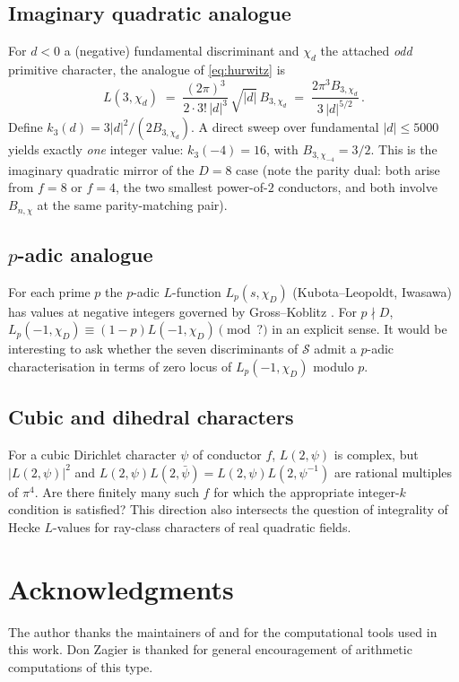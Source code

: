 \documentclass[11pt,reqno]{amsart}
\theoremstyle{plain}
\theoremstyle{definition}
\begin{document}
\subsection{Imaginary quadratic analogue}
For $d<0$ a (negative) fundamental discriminant and $\chi_{d}$ the
attached \emph{odd} primitive character, the analogue of
\eqref{eq:hurwitz} is
\[
L(3,\chi_{d})\;=\;\frac{(2\pi)^{3}}{2\cdot 3!\,|d|^{3}}\,
\sqrt{|d|}\,B_{3,\chi_{d}}\;=\;\frac{2\pi^{3}B_{3,\chi_{d}}}{3\,|d|^{5/2}}\,.
\]
Define $k_{3}(d)=3|d|^{2}/(2B_{3,\chi_{d}})$.  A direct sweep over
fundamental $|d|\le 5000$ yields exactly \emph{one} integer value:
$k_{3}(-4)=16$, with $B_{3,\chi_{-4}}=3/2$.  This is the imaginary
quadratic mirror of the $D=8$ case (note the parity dual: both
arise from $f=8$ or $f=4$, the two smallest power-of-$2$ conductors,
and both involve $B_{n,\chi}$ at the same parity-matching pair).

\subsection{$p$-adic analogue}
For each prime $p$ the $p$-adic $L$-function $L_{p}(s,\chi_{D})$
(Kubota--Leopoldt, Iwasawa) has values at negative integers governed
by Gross--Koblitz \cite{GrossKoblitz1979}.  For $p\nmid D$,
$L_{p}(-1,\chi_{D})\equiv (1-p)L(-1,\chi_{D})\pmod{?}$ in an explicit
sense.  It would be interesting to ask whether the seven
discriminants of $\mathcal{S}$ admit a $p$-adic characterisation in terms of
zero locus of $L_{p}(-1,\chi_{D})$ modulo $p$.

\subsection{Cubic and dihedral characters}
For a cubic Dirichlet character $\psi$ of conductor $f$, $L(2,\psi)$
is complex, but $|L(2,\psi)|^{2}$ and
$L(2,\psi)L(2,\bar\psi)=L(2,\psi)L(2,\psi^{-1})$ are rational
multiples of $\pi^{4}$.  Are there finitely many such $f$ for which
the appropriate integer-$k$ condition is satisfied?  This direction
also intersects the question of integrality of Hecke $L$-values for
ray-class characters of real quadratic fields.

\bigskip

\section*{Acknowledgments}
The author thanks the maintainers of \cite{PARI} and \cite{LMFDB} for
the computational tools used in this work.  Don Zagier is thanked
for general encouragement of arithmetic computations of this type.
\end{document}
